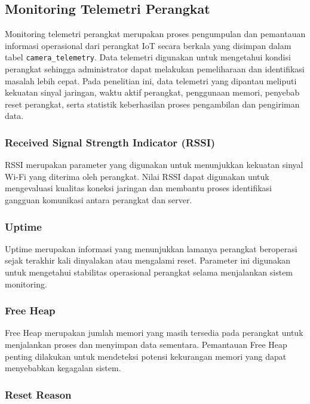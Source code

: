 \subsection{Monitoring Telemetri Perangkat}

Monitoring telemetri perangkat merupakan proses pengumpulan dan pemantauan informasi operasional dari perangkat IoT secara berkala yang disimpan dalam tabel \texttt{camera\_telemetry}. Data telemetri digunakan untuk mengetahui kondisi perangkat sehingga administrator dapat melakukan pemeliharaan dan identifikasi masalah lebih cepat. Pada penelitian ini, data telemetri yang dipantau meliputi kekuatan sinyal jaringan, waktu aktif perangkat, penggunaan memori, penyebab reset perangkat, serta statistik keberhasilan proses pengambilan dan pengiriman data.

\subsubsection{Received Signal Strength Indicator (RSSI)}

RSSI merupakan parameter yang digunakan untuk menunjukkan kekuatan sinyal Wi-Fi yang diterima oleh perangkat. Nilai RSSI dapat digunakan untuk mengevaluasi kualitas koneksi jaringan dan membantu proses identifikasi gangguan komunikasi antara perangkat dan server.

\subsubsection{Uptime}

Uptime merupakan informasi yang menunjukkan lamanya perangkat beroperasi sejak terakhir kali dinyalakan atau mengalami reset. Parameter ini digunakan untuk mengetahui stabilitas operasional perangkat selama menjalankan sistem monitoring.

\subsubsection{Free Heap}

Free Heap merupakan jumlah memori yang masih tersedia pada perangkat untuk menjalankan proses dan menyimpan data sementara. Pemantauan Free Heap penting dilakukan untuk mendeteksi potensi kekurangan memori yang dapat menyebabkan kegagalan sistem.

\subsubsection{Reset Reason}

